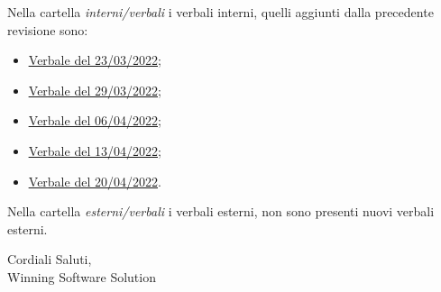 \documentclass[a4paper, 12pt]{letter}
\begin{document}
Nella cartella \textit{interni/verbali} i verbali interni, quelli aggiunti dalla precedente revisione sono:
\begin{itemize}
    \item \href{https://github.com/iota97/WinningSoftwareSolution/tree/main/public/interni/verbali/2022_03_23_I.pdf}{\underline{Verbale del 23/03/2022}};
    \item \href{https://github.com/iota97/WinningSoftwareSolution/tree/main/public/interni/verbali/2022_03_29_I.pdf}{\underline{Verbale del 29/03/2022}};
    \item \href{https://github.com/iota97/WinningSoftwareSolution/tree/main/public/interni/verbali/2022_04_06_I.pdf}{\underline{Verbale del 06/04/2022}};
    \item \href{https://github.com/iota97/WinningSoftwareSolution/tree/main/public/interni/verbali/2022_04_13_I.pdf}{\underline{Verbale del 13/04/2022}};
    \item \href{https://github.com/iota97/WinningSoftwareSolution/tree/main/public/interni/verbali/2022_04_20_I.pdf}{\underline{Verbale del 20/04/2022}}.
\end{itemize}

Nella cartella \textit{esterni/verbali} i verbali esterni, non sono presenti nuovi verbali esterni.

\begin{flushright}
Cordiali Saluti,\\
Winning Software Solution\\
\end{flushright}
\end{document}
